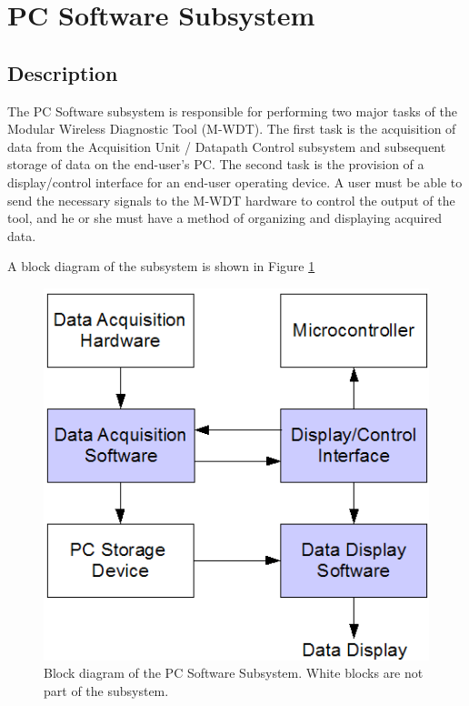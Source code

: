 \section[PC Software]{PC Software Subsystem}
\subsection{Description}
	The PC Software subsystem is responsible for performing two major tasks of 
the Modular Wireless Diagnostic Tool (M-WDT). The first task is the acquisition of data from the 
Acquisition Unit / Datapath Control subsystem and subsequent storage of data on 
the end-user's PC. The second task is the provision of a display/control 
interface for an end-user operating device. A user must be able to send the 
necessary signals to the M-WDT hardware to control the output of 
the tool, and he or she must have a method of organizing and displaying 
acquired data.

A block diagram of the subsystem is shown in Figure \ref{fig:pcsoft sub diagram}


\begin{figure}[bhp]
\begin{center}
\includegraphics[scale=0.75]{../drawings/pcsoft_sub_diagram.png}
\end{center}
\caption[PC Software Block Diagram]{Block diagram of the PC Software Subsystem. White blocks
are not part of the subsystem.}
\label{fig:pcsoft sub diagram}
\end{figure}



